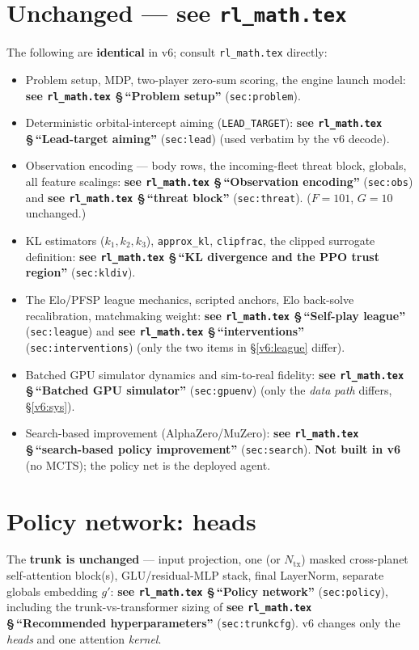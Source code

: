 \documentclass[11pt]{article}
\newcommand{\cd}[1]{\texttt{#1}}
\newcommand{\rlref}[2]{\textbf{see \texttt{rl\_math.tex} \S\,``#1''} (\texttt{#2})}
\begin{document}
\section{Unchanged --- see \texttt{rl\_math.tex}}\label{v6:same}
The following are \textbf{identical} in v6; consult \texttt{rl\_math.tex} directly:
\begin{itemize}[nosep]
  \item Problem setup, MDP, two-player zero-sum scoring, the engine launch model: \rlref{Problem setup}{sec:problem}.
  \item Deterministic orbital-intercept aiming (\cd{LEAD\_TARGET}): \rlref{Lead-target aiming}{sec:lead}
        (used verbatim by the v6 decode).
  \item Observation encoding --- body rows, the incoming-fleet threat block, globals, all feature scalings:
        \rlref{Observation encoding}{sec:obs} and \rlref{threat block}{sec:threat}. ($F{=}101$, $G{=}10$ unchanged.)
  \item KL estimators ($k_1,k_2,k_3$), \cd{approx\_kl}, \cd{clipfrac}, the clipped surrogate definition:
        \rlref{KL divergence and the PPO trust region}{sec:kldiv}.
  \item The Elo/PFSP league mechanics, scripted anchors, Elo back-solve recalibration, matchmaking weight:
        \rlref{Self-play league}{sec:league} and \rlref{interventions}{sec:interventions} (only the two items
        in \S\ref{v6:league} differ).
  \item Batched GPU simulator dynamics and sim-to-real fidelity: \rlref{Batched GPU simulator}{sec:gpuenv}
        (only the \emph{data path} differs, \S\ref{v6:sys}).
  \item Search-based improvement (AlphaZero/MuZero): \rlref{search-based policy improvement}{sec:search}.
        \textbf{Not built in v6} (no MCTS); the policy net is the deployed agent.
\end{itemize}

\section{Policy network: heads}\label{v6:net}
The \textbf{trunk is unchanged} --- input projection, one (or $N_{\mathrm{tx}}$) masked cross-planet
self-attention block(s), GLU/residual-MLP stack, final LayerNorm, separate globals embedding $g'$:
\rlref{Policy network}{sec:policy}, including the trunk-vs-transformer sizing of \rlref{Recommended
hyperparameters}{sec:trunkcfg}. v6 changes only the \emph{heads} and one attention \emph{kernel}.
\end{document}
